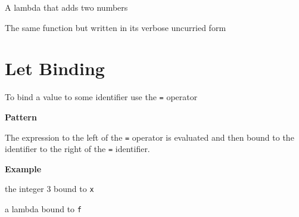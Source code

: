 A lambda that adds two numbers

\begin{Shaded}
\begin{Highlighting}[]
\OtherTok{{-}\textgreater{}}\OperatorTok{+}
\end{Highlighting}
\end{Shaded}

The same function but written in its verbose uncurried form

\begin{Shaded}
\begin{Highlighting}[]
\OtherTok{{-}\textgreater{}}\OtherTok{{-}\textgreater{}}\OperatorTok{+}
\end{Highlighting}
\end{Shaded}

\section{Let Binding}\label{haskell-cheat-sheet.md__let-binding}

To bind a value to some identifier use the \texttt{=} operator

\textbf{Pattern}

\begin{Shaded}
\begin{Highlighting}[]
\OtherTok{=} \OperatorTok{\textless{}}\OperatorTok{\textgreater{}}
\end{Highlighting}
\end{Shaded}

The expression to the left of the \texttt{=} operator is evaluated and
then bound to the identifier to the right of the \texttt{=} identifier.

\textbf{Example}

the integer 3 bound to \texttt{x}

\begin{Shaded}
\begin{Highlighting}[]
\OtherTok{=} 
\end{Highlighting}
\end{Shaded}

a lambda bound to \texttt{f}

\begin{Shaded}
\begin{Highlighting}[]
\OtherTok{=}\OtherTok{{-}\textgreater{}}\OperatorTok{+}
\end{Highlighting}
\end{Shaded}

